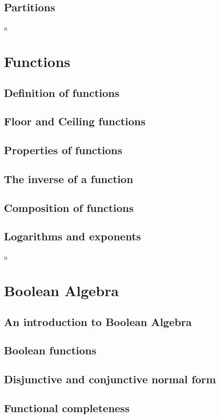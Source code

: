 \documentclass{article}
\begin{document}
\subsection{Partitions}

a

\section{Functions}
\subsection{Definition of functions}
\subsection{Floor and Ceiling functions}
\subsection{Properties of functions}
\subsection{The inverse of a function}
\subsection{Composition of functions}
\subsection{Logarithms and exponents}

a

\section{Boolean Algebra}
\subsection{An introduction to Boolean Algebra}
\subsection{Boolean functions}
\subsection{Disjunctive and conjunctive normal form}
\subsection{Functional completeness}
\end{document}
